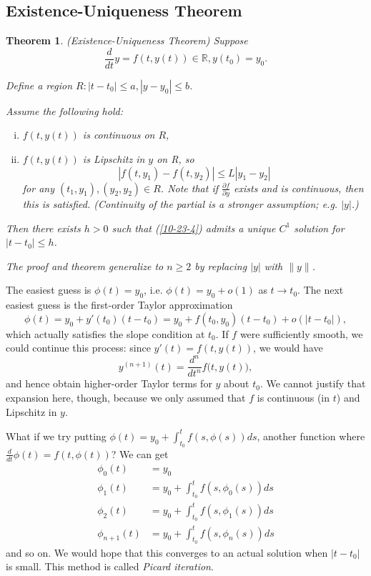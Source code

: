 \documentclass{tufte-handout}
\newcommand*\R{\mathbb{R}}
\newtheorem{thm}{Theorem}[subsection]
\theoremstyle{definition}
\begin{document}
\subsection{Existence-Uniqueness Theorem}

\begin{thm}
	(Existence-Uniqueness Theorem) Suppose 
	\begin{equation}
		\frac{d}{dt}y = f(t,y(t)) \in \R, y(t_0) = y_0 \label{10-23-4}
	.\end{equation}

	Define a region $R: \left| t-t_0 \right|\le a, \left| y-y_0 \right|\le b$. 

	Assume the following hold:
	\begin{enumerate}[(i)]
		\item $f(t,y(t))$ is continuous on $R$, 
		\item $f(t,y(t))$ is Lipschitz in $y$ on R, so \[
			\left| f(t,y_1) - f(t,y_2) \right| \le L \left| y_1-y_2 \right|
		\] for any $(t_1,y_1), (y_2,y_2) \in R$. Note that if $\frac{\partial f}{\partial y}$ exists and is continuous, then this is satisfied. (Continuity of the partial is a stronger assumption; e.g. $\left| y \right|$.)
	\end{enumerate}

	Then there exists $h > 0$ such that (\ref{10-23-4}) admits a unique $C^{1}$ solution for $\left| t-t_0 \right| \le h$.
	
	The proof and theorem generalize to $n \ge 2$ by replacing $\left| y \right|$ with $\|y\|$.
\end{thm}


The easiest guess is $\phi(t)=y_0$, i.e. $\phi(t)=y_0+o(1)$ as $t\to t_0$.
The next easiest guess is the first-order Taylor approximation
\[
	\phi(t)=y_0+y'(t_0)(t-t_0)
	= y_0+f(t_0,y_0)(t-t_0)+o(|t-t_0|),
\]
which actually satisfies the slope condition at $t_0$. If $f$ were sufficiently smooth, we could continue this process: since
$y'(t)=f(t,y(t))$, we would have
\[
	y^{(n+1)}(t)=\frac{d^n}{dt^n} f\bigl(t,y(t)\bigr),
\]
and hence obtain higher-order Taylor terms for $y$ about $t_0$.
We cannot justify that expansion here, though, because we only assumed that
$f$ is continuous (in $t$) and Lipschitz in $y$.

What if we try putting $\phi(t) = y_0 + \int_{t_0}^{t} f(s,\phi(s))ds $, another function where $\frac{d}{dt}\phi(t) = f(t, \phi(t))$?
We can get
\begin{align*}
	\phi_0(t) &= y_0 \\
	\phi_1(t) &= y_0 + \int_{t_0}^{t} f(s,\phi_0(s))ds  \\
	\phi_2(t) &= y_0 + \int_{t_0}^{t} f(s,\phi_1(s))ds \\
	\phi_{n+1}(t) &= y_0 + \int_{t_0}^{t} f(s,\phi_n(s))ds 
\end{align*} and so on. We would hope that this converges to an actual solution when $\left| t-t_0 \right|$ is small. This method is called \emph{Picard iteration}.
\end{document}
